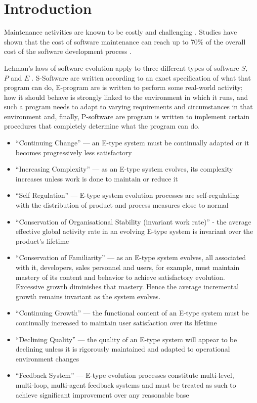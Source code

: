 
\setcounter{page}{1}

\chapter{Introduction}

Maintenance activities are known to be costly and challenging \cite{Pressman2005}. Studies have shown that the cost of software maintenance can reach up to 70\% of the overall cost of the software development process \cite{HealthSocial2002}.

Lehman's laws of software evolution apply to three different types of software $S$, $P$ and $E$ \cite{lehman1980programs}. S-Software are written according to an exact specification of what that program can do, E-program are is written to perform some real-world activity; how it should behave is strongly linked to the environment in which it runs, and such a program needs to adapt to varying requirements and circumstances in that environment and, finally, P-software are program is written to implement certain procedures that completely determine what the program can do.

\begin{itemize}
	\item ``Continuing Change'' — an E-type system must be continually adapted or it becomes progressively less satisfactory
	\item ``Increasing Complexity'' — as an E-type system evolves, its complexity increases unless work is done to maintain or reduce it
	\item  ``Self Regulation'' — E-type system evolution processes are self-regulating with the distribution of product and process measures close to normal
	\item ``Conservation of Organisational Stability (invariant work rate)'' - the average effective global activity rate in an evolving E-type system is invariant over the product's lifetime
	\item ``Conservation of Familiarity'' — as an E-type system evolves, all associated with it, developers, sales personnel and users, for example, must maintain mastery of its content and behavior to achieve satisfactory evolution. Excessive growth diminishes that mastery. Hence the average incremental growth remains invariant as the system evolves.
	\item ``Continuing Growth'' — the functional content of an E-type system must be continually increased to maintain user satisfaction over its lifetime
	\item ``Declining Quality'' — the quality of an E-type system will appear to be declining unless it is rigorously maintained and adapted to operational environment changes
	\item ``Feedback System'' — E-type evolution processes constitute multi-level, multi-loop, multi-agent feedback systems and must be treated as such to achieve significant improvement over any reasonable base
\end{itemize}


